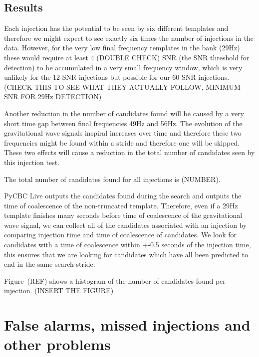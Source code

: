 \subsection{Results}


Each injection has the potential to be seen by six different templates and therefore we might expect to see exactly six times the number of injections in the data. However, for the very low final frequency templates in the bank (29Hz) these would require at least 4 (DOUBLE CHECK) SNR (the SNR threshold for detection) to be accumulated in a very small frequency window, which is very unlikely for the 12 SNR injections but possible for our 60 SNR injections. (CHECK THIS TO SEE WHAT THEY ACTUALLY FOLLOW, MINIMUM SNR FOR 29Hz DETECTION)

Another reduction in the number of candidates found will be caused by a very short time gap between final frequencies 49Hz and 56Hz. The evolution of the gravitational wave signals inspiral increases over time and therefore these two frequencies might be found within a stride and therefore one will be skipped. These two effects will cause a reduction in the total number of candidates seen by this injection test.

The total number of candidates found for all injections is (NUMBER). 

PyCBC Live outputs the candidates found during the search and outputs the time of coalescence of the non-truncated template. Therefore, even if a 29Hz template finishes many seconds before time of coalescence of the gravitational wave signal, we can collect all of the candidates associated with an injection by comparing injection time and time of coalescence of candidates. We look for candidates with a time of coalescence within +-0.5 seconds of the injection time, this ensures that we are looking for candidates which have all been predicted to end in the same search stride.

Figure~(REF) shows a histogram of the number of candidates found per injection. (INSERT THE FIGURE)

\section{\label{6:sec:identified-problems}False alarms, missed injections and other problems}

